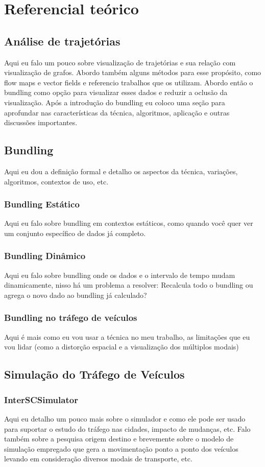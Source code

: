 \chapter{Referencial teórico}
\label{cap:referencial-teorico}

\section{Análise de trajetórias}

Aqui eu falo um pouco sobre visualização de trajetórias e sua relação com
visualização de grafos. Abordo também alguns métodos para esse propósito, como
flow maps e vector fields e referencio trabalhos que os utilizam. Abordo então
o bundling como opção para visualizar esses dados e reduzir a oclusão da visualização.
Após a introdução do bundling eu coloco uma seção para aprofundar nas características
da técnica, algoritmos, aplicação e outras discussões importantes.

\section{Bundling}
    Aqui eu dou a definição formal e detalho os aspectos da técnica, variações,
algoritmos, contextos de uso, etc.

\subsection{Bundling Estático}
    Aqui eu falo sobre bundling em contextos estáticos, como quando você quer
ver um conjunto específico de dados já completo.

\subsection{Bundling Dinâmico}
    Aqui eu falo sobre bundling onde os dados e o intervalo de tempo mudam
dinamicamente, nisso há um problema a resolver: Recalcula todo o bundling ou
agrega o novo dado ao bundling já calculado?

\subsection{Bundling no tráfego de veículos}
    Aqui é mais como eu vou usar a técnica no meu trabalho, as limitações que
eu vou lidar (como a distorção espacial e a visualização dos múltiplos modais)

\section{Simulação do Tráfego de Veículos}

\subsection{InterSCSimulator}
Aqui eu detalho um pouco mais sobre o simulador e como ele pode ser usado para
suportar o estudo do tráfego nas cidades, impacto de mudanças, etc. Falo também
sobre a pesquisa origem destino e brevemente sobre o modelo de simulação empregado
que gera a movimentação ponto a ponto dos veículos levando em consideração diversos
modais de transporte, etc.

